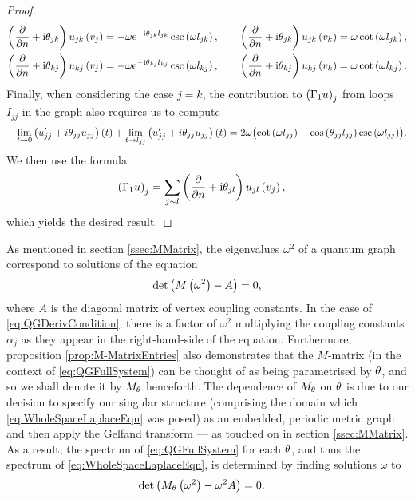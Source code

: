 \begin{proof}
\begin{align*}
		\left( \dfrac{\partial }{\partial n}+\mathrm{i}\theta_{jk} \right)u_{jk}\left( v_j \right) = -\omega \mathrm{e}^{-\mathrm{i}\theta_{jk}l_{jk}}\csc\left( \omega l_{jk} \right), 
		&\qquad \left( \dfrac{\partial }{\partial n}+\mathrm{i}\theta_{jk} \right)u_{jk}\left( v_k \right) = \omega\cot\left( \omega l_{jk} \right), \\
		\left( \dfrac{\partial }{\partial n}+\mathrm{i}\theta_{kj} \right)u_{kj}\left( v_j \right) = -\omega \mathrm{e}^{-\mathrm{i}\theta_{kj}l_{kj}}\csc\left( \omega l_{kj} \right), 
		&\qquad \left( \dfrac{\partial }{\partial n}+\mathrm{i}\theta_{kj} \right)u_{kj}\left( v_k \right) = \omega\cot\left( \omega l_{kj} \right).
	\end{align*}
	Finally, when considering the case $j=k$, the contribution to $\left( \Gamma_1 u \right)_j$ from loops $I_{jj}$ in the graph also requires us to compute
	\begin{align*}
		-\lim_{t\rightarrow0}\left( u_{jj}'+i\theta_{jj}u_{jj} \right)(t) + \lim_{t\rightarrow l_{jj}}\left( u_{jj}'+i\theta_{jj}u_{jj} \right)(t)
		= 2\omega\bigl( \cot\left( \omega l_{jj} \right) - \cos\left( \theta_{jj}l_{jj} \right)\csc\left( \omega l_{jj} \right) \bigr).	
	\end{align*}
	We then use the formula
	\begin{align*}
		\left( \Gamma_1 u \right)_j &= \sum_{j\sim l} \left( \dfrac{\partial }{\partial n}+\mathrm{i}\theta_{jl} \right)u_{jl}\left( v_j \right),
	\end{align*}
	which yields the desired result.
\end{proof}

As mentioned in section \ref{ssec:MMatrix}, the eigenvalues $\omega^2$ of a quantum graph correspond to solutions of the equation
\begin{align*}
	\det\left(  M\left( \omega^2 \right) - A  \right) = 0,
\end{align*}
where $A$ is the diagonal matrix of vertex coupling constants.
In the case of \eqref{eq:QGDerivCondition}, there is a factor of $\omega^2$ multiplying the coupling constants $\alpha_j$ as they appear in the right-hand-side of the equation.
Furthermore, proposition \ref{prop:M-MatrixEntries} also demonstrates that the $M$-matrix (in the context of \eqref{eq:QGFullSystem}) can be thought of as being parametrised by $\theta$, and so we shall denote it by $M_{\theta}$ henceforth.
The dependence of $M_\theta$ on $\theta$ is due to our decision to specify our singular structure (comprising the domain which \eqref{eq:WholeSpaceLaplaceEqn} was posed) as an embedded, periodic metric graph and then apply the Gelfand transform --- as touched on in section \ref{ssec:MMatrix}.
As a result; the spectrum of \eqref{eq:QGFullSystem} for each $\theta$, and thus the spectrum of \eqref{eq:WholeSpaceLaplaceEqn}, is determined by finding solutions $\omega$ to
\begin{align} \label{eq:QGDetSolveCondition}
	\det\left( M_\theta\left( \omega^2 \right) - \omega^2 A \right) &= 0.
\end{align}

